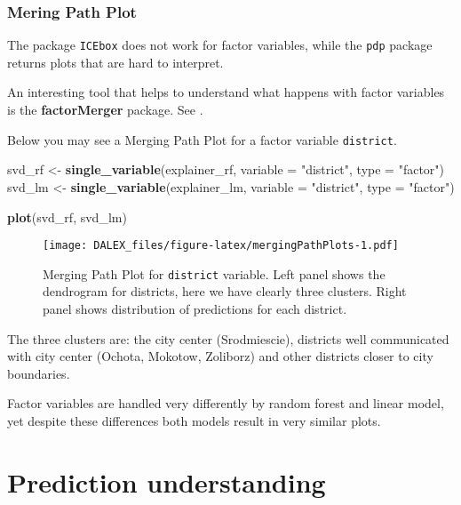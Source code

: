 \documentclass[]{book}
\newenvironment{Shaded}{\begin{snugshade}}{\end{snugshade}}
\newcommand{\DataTypeTok}[1]{\textcolor[rgb]{0.13,0.29,0.53}{#1}}
\newcommand{\KeywordTok}[1]{\textcolor[rgb]{0.13,0.29,0.53}{\textbf{#1}}}
\newcommand{\NormalTok}[1]{#1}
\newcommand{\StringTok}[1]{\textcolor[rgb]{0.31,0.60,0.02}{#1}}
\theoremstyle{definition}
\theoremstyle{definition}
\theoremstyle{definition}
\theoremstyle{remark}
\begin{document}
\hypertarget{mergingPathPlot}{%
\subsection{Mering Path Plot}\label{mergingPathPlot}}

The package \texttt{ICEbox} does not work for factor variables, while
the \texttt{pdp} package returns plots that are hard to interpret.

An interesting tool that helps to understand what happens with factor
variables is the \textbf{factorMerger} package. See
\citep{factorMerger}.

Below you may see a Merging Path Plot for a factor variable
\texttt{district}.

\begin{Shaded}
\begin{Highlighting}[]
\NormalTok{svd_rf  <-}\StringTok{ }\KeywordTok{single_variable}\NormalTok{(explainer_rf, }\DataTypeTok{variable =} \StringTok{"district"}\NormalTok{, }\DataTypeTok{type =} \StringTok{"factor"}\NormalTok{)}
\NormalTok{svd_lm  <-}\StringTok{ }\KeywordTok{single_variable}\NormalTok{(explainer_lm, }\DataTypeTok{variable =} \StringTok{"district"}\NormalTok{, }\DataTypeTok{type =} \StringTok{"factor"}\NormalTok{)}

\KeywordTok{plot}\NormalTok{(svd_rf, svd_lm)}
\end{Highlighting}
\end{Shaded}

\begin{figure}
\centering
\texttt{[image: DALEX\_files/figure-latex/mergingPathPlots-1.pdf]}
\caption{\label{fig:mergingPathPlots}Merging Path Plot for \texttt{district}
variable. Left panel shows the dendrogram for districts, here we have
clearly three clusters. Right panel shows distribution of predictions
for each district.}
\end{figure}

The three clusters are: the city center (Srodmiescie), districts well
communicated with city center (Ochota, Mokotow, Zoliborz) and other
districts closer to city boundaries.

Factor variables are handled very differently by random forest and
linear model, yet despite these differences both models result in very
similar plots.

\hypertarget{predictionUnderstanding}{%
\chapter{Prediction understanding}\label{predictionUnderstanding}}
\end{document}
